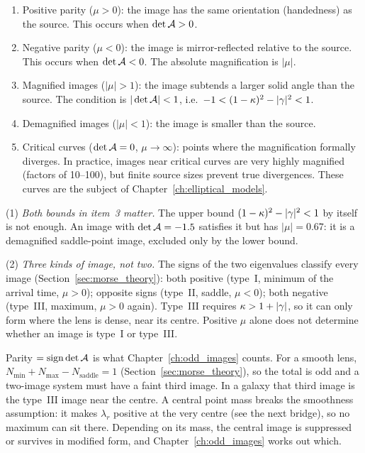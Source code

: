 \begin{enumerate}
    \item Positive parity ($\mu > 0$): the image has the
          same orientation (handedness) as the source.  This occurs
          when $\det \mathcal{A} > 0$.

    \item Negative parity ($\mu < 0$): the image is
          mirror-reflected relative to the source.  This occurs when
          $\det \mathcal{A} < 0$.  The absolute magnification is
          $|\mu|$.

    \item Magnified images ($|\mu| > 1$): the image
          subtends a larger solid angle than the source.  The
          condition is $|\det\mathcal{A}| < 1$, i.e.\
          $-1 < (1 - \kappa)^2 - |\gamma|^2 < 1$.

    \item Demagnified images ($|\mu| < 1$): the image is
          smaller than the source.

    \item Critical curves ($\det \mathcal{A} = 0$, $\mu \to \infty$):
          points where the magnification formally diverges.  In
          practice, images near critical curves are very highly
          magnified (factors of 10--100), but finite source sizes
          prevent true divergences.  These curves are the subject
          of Chapter~\ref{ch:elliptical_models}.
\end{enumerate}
\begin{annotation}
(1) \emph{Both bounds in item~3 matter.} The upper bound
$(1-\kappa)^2 - |\gamma|^2 < 1$ by itself is not enough. An image with
$\det\mathcal{A} = -1.5$ satisfies it but has $|\mu| = 0.67$: it is a demagnified
saddle-point image, excluded only by the lower bound.

(2) \emph{Three kinds of image, not two.} The signs of the two eigenvalues
classify every image (Section~\ref{sec:morse_theory}):
both positive (type~I, minimum of the arrival time, $\mu > 0$); opposite
signs (type~II, saddle, $\mu < 0$); both negative (type~III, maximum,
$\mu > 0$ again). Type~III requires $\kappa > 1 + |\gamma|$, so it can only
form where the lens is dense, near its centre. Positive $\mu$ alone does not
determine whether an image is type~I or type~III.
\end{annotation}
\begin{bridge}
Parity $= \operatorname{sign}\det\mathcal{A}$ is what Chapter~\ref{ch:odd_images}
counts. For a smooth lens, $N_{\min} + N_{\max} - N_{\mathrm{saddle}} = 1$
(Section~\ref{sec:morse_theory}), so the total is odd and a two-image system
must have a faint third image. In a galaxy that third image is the type~III
image near the centre. A central point mass breaks the smoothness assumption:
it makes $\lambda_r$ positive at the very centre (see the next bridge), so no
maximum can sit there. Depending on its mass, the central image is suppressed
or survives in modified form, and Chapter~\ref{ch:odd_images} works out which.
\end{bridge}

